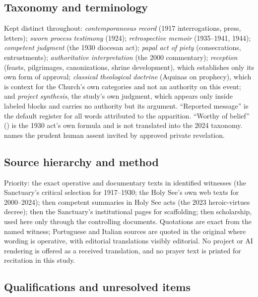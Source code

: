 \subsection*{Taxonomy and terminology}

Kept distinct throughout: \emph{contemporaneous record} (1917
interrogations, press, letters); \emph{sworn process testimony}
(1924); \emph{retrospective memoir} (1935--1941, 1944); \emph{competent
judgment} (the 1930 diocesan act); \emph{papal act of piety}
(consecrations, entrustments); \emph{authoritative interpretation}
(the 2000 commentary); \emph{reception} (feasts, pilgrimages,
canonizations, shrine development), which establishes only its own
form of approval; \emph{classical theological doctrine} (Aquinas on
prophecy), which is context for the Church's own categories and not
an authority on this event; and \emph{project synthesis}, the
study's own judgment, which appears only inside labeled blocks and
carries no authority but its argument. ``Reported
message'' is the default register for all words attributed to the
apparition. ``Worthy of belief'' () is the
1930 act's own formula and is not translated into the 2024 taxonomy.
 names the prudent human assent invited by
approved private revelation.

\subsection*{Source hierarchy and method}

Priority: the exact operative and documentary texts in identified
witnesses (the Sanctuary's critical selection for 1917--1930; the
Holy See's own web texts for 2000--2024); then competent summaries in
Holy See acts (the 2023 heroic-virtues decree); then the Sanctuary's
institutional pages for scaffolding; then scholarship, used here only
through the controlling documents. Quotations are exact from the
named witness; Portuguese and Italian sources are quoted in the
original where wording is operative, with editorial translations
visibly editorial. No project or AI rendering is offered as a
received translation, and no prayer text is printed for recitation in
this study.

\subsection*{Qualifications and unresolved items}

